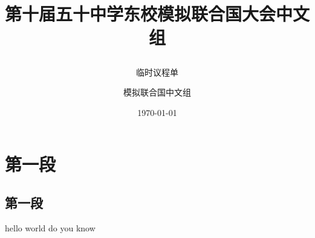 \documentclass{article}
\title{第十届五十中学东校模拟联合国大会中文组 \\ \subtitle{临时议程单}}
\date{\today}
\author{模拟联合国中文组}
\begin{document}
\newpage
\maketitle
\section{第一段}
\subsection{第一段}
hello world do you know
\end{document}
